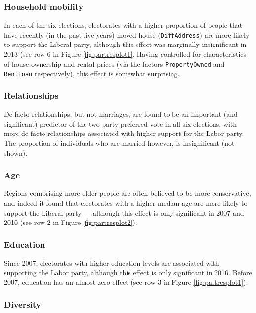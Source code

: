 \documentclass[11pt,a4paper,]{article}
\begin{document}
\subsubsection{Household mobility}\label{household-mobility}

In each of the six elections, electorates with a higher proportion of
people that have recently (in the past five years) moved house
(\texttt{DiffAddress}) are more likely to support the Liberal party,
although this effect was marginally insignificant in 2013 (see row 6 in
Figure \ref{fig:partresplot1}. Having controlled for characteristics of
house ownership and rental prices (via the factors
\texttt{PropertyOwned} and \texttt{RentLoan} respectively), this effect
is somewhat surprising.

\subsubsection{Relationships}\label{relationships}

De facto relationships, but not marriages, are found to be an important
(and significant) predictor of the two-party preferred vote in all six
elections, with more de facto relationships associated with higher
support for the Labor party. The proportion of individuals who are
married however, is insignificant (not shown).

\subsubsection{Age}\label{age}

Regions comprising more older people are often believed to be more
conservative, and indeed it found that electorates with a higher median
age are more likely to support the Liberal party --- although this
effect is only significant in 2007 and 2010 (see row 2 in Figure
\ref{fig:partresplot2}).

\subsubsection{Education}\label{education}

Since 2007, electorates with higher education levels are associated with
supporting the Labor party, although this effect is only significant in
2016. Before 2007, education has an almost zero effect (see row 3 in
Figure \ref{fig:partresplot1}).

\subsubsection{Diversity}\label{diversity}
\end{document}
